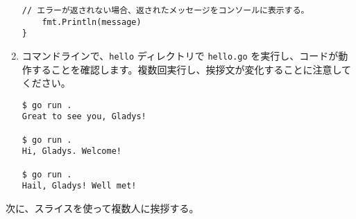 \begin{enumerate}
\begin{lstlisting}[numbers=none]
    // エラーが返されない場合、返されたメッセージをコンソールに表示する。
    fmt.Println(message)
}
\end{lstlisting}

\item コマンドラインで、\texttt{hello} ディレクトリで \texttt{hello.go} を実行し、コードが動作することを確認します。複数回実行し、挨拶文が変化することに注意してください。
\begin{lstlisting}[numbers=none]
$ go run .
Great to see you, Gladys!

$ go run .
Hi, Gladys. Welcome!

$ go run .
Hail, Gladys! Well met!
\end{lstlisting}
\end{enumerate}


次に、スライスを使って複数人に挨拶する。


